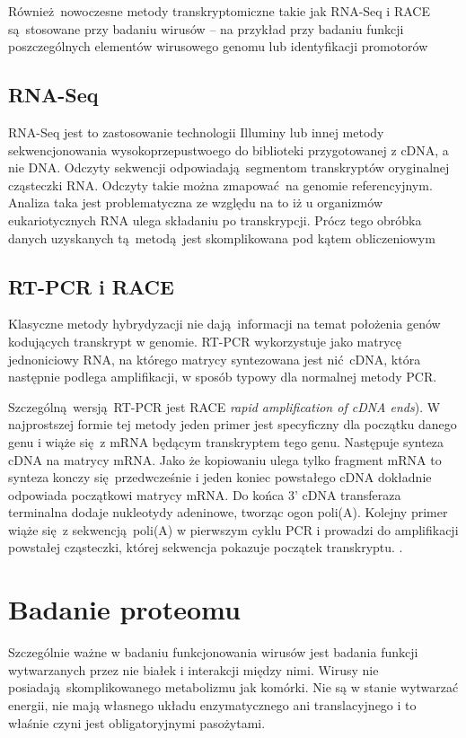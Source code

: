 \documentclass[two column, twoside, a4paper]{article}
\begin{document}
Również nowoczesne metody transkryptomiczne takie jak RNA-Seq i RACE są stosowane przy badaniu wirusów -- na przykład przy badaniu funkcji poszczególnych elementów wirusowego genomu lub identyfikacji promotorów \autocite{Steger2001}

\subsection{RNA-Seq}

RNA-Seq jest to zastosowanie technologii Illuminy lub innej metody sekwencjonowania wysokoprzepustwoego do biblioteki przygotowanej z cDNA, a nie DNA. Odczyty sekwencji odpowiadają segmentom transkryptów oryginalnej cząsteczki RNA. Odczyty takie można zmapować na genomie referencyjnym. Analiza taka jest problematyczna ze względu na to iż u organizmów eukariotycznych RNA ulega składaniu po transkrypcji. Prócz tego obróbka danych uzyskanych tą metodą jest skomplikowana pod kątem obliczeniowym \autocite{Brown2019}

\subsection{RT-PCR i RACE}

Klasyczne metody hybrydyzacji nie dają informacji na temat położenia genów kodujących transkrypt w genomie. RT-PCR wykorzystuje jako matrycę jednoniciowy RNA, na którego matrycy syntezowana jest nić cDNA, która następnie podlega amplifikacji, w sposób typowy dla normalnej metody PCR.

Szczególną wersją RT-PCR jest RACE \textit{rapid amplification of cDNA ends}). W najprostszej formie tej metody jeden primer jest specyficzny dla początku danego genu i wiąże się z mRNA będącym transkryptem tego genu. Następuje synteza cDNA na matrycy mRNA. Jako że kopiowaniu ulega tylko fragment mRNA to synteza konczy się przedwcześnie i jeden koniec powstałego cDNA dokładnie odpowiada początkowi matrycy mRNA. Do końca 3' cDNA transferaza terminalna dodaje nukleotydy adeninowe, tworząc ogon poli(A). Kolejny primer wiąże się z sekwencją poli(A) w pierwszym cyklu PCR i prowadzi do amplifikacji powstałej cząsteczki, której sekwencja pokazuje początek transkryptu. \autocite{Brown2019}.

\section{Badanie proteomu}

Szczególnie ważne w badaniu funkcjonowania wirusów jest badania funkcji wytwarzanych przez nie białek i interakcji między nimi. Wirusy nie posiadają skomplikowanego metabolizmu jak komórki. Nie są w stanie wytwarzać energii, nie mają własnego układu enzymatycznego ani translacyjnego i to właśnie czyni jest obligatoryjnymi pasożytami.
\end{document}
